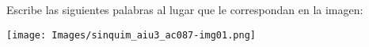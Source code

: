 Escribe las siguientes palabras al lugar que le correspondan en la imagen:

\begin{center}
     \quad {} \quad {} \quad
     \quad {} \quad {} \quad
\end{center}
\begin{center}
    \texttt{[image: Images/sinquim\_aiu3\_ac087-img01.png]}
\end{center}
